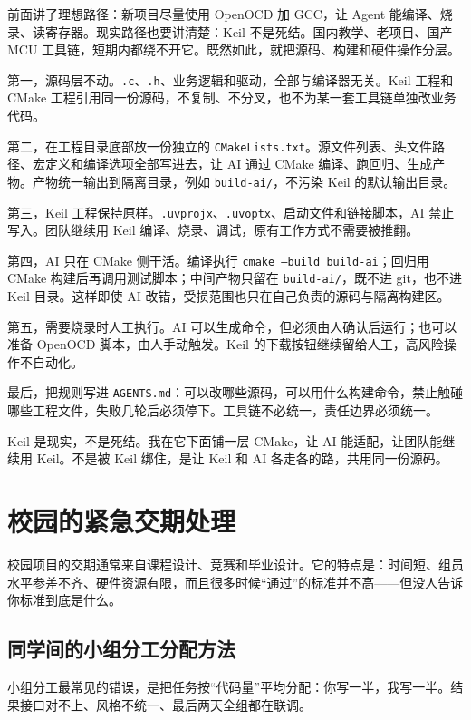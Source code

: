 前面讲了理想路径：新项目尽量使用 OpenOCD 加 GCC，让 Agent 能编译、烧录、读寄存器。现实路径也要讲清楚：Keil 不是死结。国内教学、老项目、国产 MCU 工具链，短期内都绕不开它。既然如此，就把源码、构建和硬件操作分层。

第一，源码层不动。\texttt{.c}、\texttt{.h}、业务逻辑和驱动，全部与编译器无关。Keil 工程和 CMake 工程引用同一份源码，不复制、不分叉，也不为某一套工具链单独改业务代码。

第二，在工程目录底部放一份独立的 \texttt{CMakeLists.txt}。源文件列表、头文件路径、宏定义和编译选项全部写进去，让 AI 通过 CMake 编译、跑回归、生成产物。产物统一输出到隔离目录，例如 \texttt{build-ai/}，不污染 Keil 的默认输出目录。

第三，Keil 工程保持原样。\texttt{.uvprojx}、\texttt{.uvoptx}、启动文件和链接脚本，AI 禁止写入。团队继续用 Keil 编译、烧录、调试，原有工作方式不需要被推翻。

第四，AI 只在 CMake 侧干活。编译执行 \texttt{cmake --build build-ai}；回归用 CMake 构建后再调用测试脚本；中间产物只留在 \texttt{build-ai/}，既不进 git，也不进 Keil 目录。这样即使 AI 改错，受损范围也只在自己负责的源码与隔离构建区。

第五，需要烧录时人工执行。AI 可以生成命令，但必须由人确认后运行；也可以准备 OpenOCD 脚本，由人手动触发。Keil 的下载按钮继续留给人工，高风险操作不自动化。

最后，把规则写进 \texttt{AGENTS.md}：可以改哪些源码，可以用什么构建命令，禁止触碰哪些工程文件，失败几轮后必须停下。工具链不必统一，责任边界必须统一。

Keil 是现实，不是死结。我在它下面铺一层 CMake，让 AI 能适配，让团队能继续用 Keil。不是被 Keil 绑住，是让 Keil 和 AI 各走各的路，共用同一份源码。

\section{校园的紧急交期处理}

校园项目的交期通常来自课程设计、竞赛和毕业设计。它的特点是：时间短、组员水平参差不齐、硬件资源有限，而且很多时候“通过”的标准并不高——但没人告诉你标准到底是什么。

\subsection{同学间的小组分工分配方法}

小组分工最常见的错误，是把任务按“代码量”平均分配：你写一半，我写一半。结果接口对不上、风格不统一、最后两天全组都在联调。

